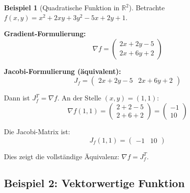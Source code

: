 ﻿\documentclass[a4paper,12pt]{article}
\theoremstyle{definition}
\newtheorem{beispiel}{Beispiel}
\begin{document}
\begin{beispiel}[Quadratische Funktion in $\mathbb{R}^2$]
	Betrachte $f(x, y) = x^2 + 2xy + 3y^2 - 5x + 2y + 1$.
	
	\textbf{Gradient-Formulierung:}
	\[
	\nabla f = \begin{pmatrix} 2x + 2y - 5 \\ 2x + 6y + 2 \end{pmatrix}
	\]
	
	\textbf{Jacobi-Formulierung (äquivalent):}
	\[
	J_f = \begin{pmatrix} 2x + 2y - 5 & 2x + 6y + 2 \end{pmatrix}
	\]
	
	Dann ist $J_f^T = \nabla f$. An der Stelle $(x, y) = (1, 1)$:
	\[
	\nabla f(1,1) = \begin{pmatrix} 2 + 2 - 5 \\ 2 + 6 + 2 \end{pmatrix} = \begin{pmatrix} -1 \\ 10 \end{pmatrix}
	\]
	
	Die Jacobi-Matrix ist:
	\[
	J_f(1,1) = \begin{pmatrix} -1 & 10 \end{pmatrix}
	\]
	
	Dies zeigt die vollständige Äquivalenz: $\nabla f = J_f^T$.
\end{beispiel}

\subsection{Beispiel 2: Vektorwertige Funktion}
\end{document}
